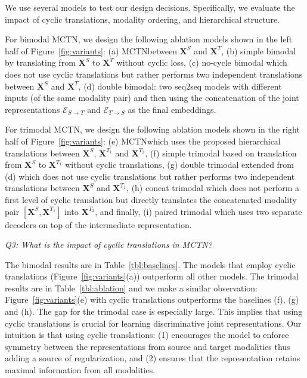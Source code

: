 \documentclass[letterpaper]{article} %
\newcommand{\ours}{MCTN}
\begin{document}
We use several models to test our design decisions. Specifically, we evaluate the impact of cyclic translations, modality ordering, and hierarchical structure.

For bimodal \ours, we design the following ablation models shown in the left half of Figure~\ref{fig:variants}: (a) \ours \bimodal between $\mathbf{X}^S$ and $\mathbf{X}^T$, (b) simple bimodal by translating from $\mathbf{X}^S$ to $\mathbf{X}^T$ without cyclic loss, (c) no-cycle bimodal which does not use cyclic translations but rather performs two independent translations between $\mathbf{X}^S$ and $\mathbf{X}^T$, (d) double bimodal: two seq2seq models with different inputs (of the same modality pair) and then  using the concatenation of the joint representations ${\mathcal{E}}_{S \rightarrow T}$ and ${\mathcal{E}}_{T \rightarrow S}$ as the final embeddings. 
%

For trimodal \ours, we design the following ablation models shown in the right half of Figure~\ref{fig:variants}: (e) \ours \trimodal which uses the proposed hierarchical translations between $\mathbf{X}^S$, $\mathbf{X}^{T_1}$ and $\mathbf{X}^{T_2}$, (f) simple trimodal based on translation from $\mathbf{X}^S$ to $\mathbf{X}^{T_1}$ without cyclic translations, (g) double trimodal extended from (d) which does not use cyclic translations but rather performs two independent translations between $\mathbf{X}^S$ and $\mathbf{X}^{T_1}$, (h) concat trimodal which does not perform a first level of cyclic translation but directly translates the concatenated modality pair $[\mathbf{X}^S, \mathbf{X}^{T_1}]$ into $\mathbf{X}^{T_2}$, and finally, (i) paired trimodal which uses two separate decoders on top of the intermediate representation.

\textit{Q3: What is the impact of cyclic translations in \ours?}

The bimodal results are in Table~\ref{tbl:baselines}. The models that employ cyclic translations (Figure~\ref{fig:variants}(a)) outperform all other models. The trimodal results are in Table~\ref{tbl:ablation} and we make a similar observation: Figure~\ref{fig:variants}(e) with cyclic translations outperforms the baselines (f), (g) and (h). The gap for the trimodal case is especially large. This implies that using cyclic translations is crucial for learning discriminative joint representations. Our intuition is that using cyclic translations: (1) encourages the model to enforce symmetry between the representations from source and target modalities thus adding a source of regularization, and (2) ensures that the representation retains maximal information from all modalities.
\end{document}
